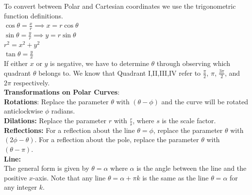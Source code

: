         \noindent To convert between Polar and Cartesian coordinates we use the trigonometric
        function definitions. \\
        $\cos\theta=\frac{x}{r}\implies x=r\cos\theta$ \\
        $\sin\theta=\frac{y}{r}\implies y=r\sin\theta$ \\
        $r^2=x^2+y^2$ \\
        $\tan\theta=\frac{y}{x}$ \\
        \noindent If either $x$ or $y$ is negative, we have to determine $\theta$ through
        observing which quadrant $\theta$ belongs to. We know that Quadrant I,II,III,IV refer to
        $\frac{\pi}{2}$, $\pi$, $\frac{3\pi}{2}$, and $2\pi$ respectively. \\

        \noindent \textbf{Transformations on Polar Curves}: \\
        \textbf{Rotations}: Replace the parameter $\theta$ with $(\theta-\phi)$ and the curve
        will be rotated anticlockwise $\phi$ radians. \\
        \textbf{Dilations:} Replace the parameter $r$ with $\frac{r}{s}$, where $s$ is the scale
        factor. \\
        \textbf{Reflections:} For a reflection about the line $\theta=\phi$, replace the parameter
        $\theta$ with $(2\phi-\theta)$. For a reflection about the pole, replace the parameter
        $\theta$ with $(\theta-\pi)$. \\

        \noindent \textbf{Line:} \\
        The general form is given by $\theta=\alpha$ where $\alpha$ is the angle between the line
        and the positive $x$-axis. Note that any line $\theta=\alpha+\pi k$ is the same as the
        line $\theta=\alpha$ for any integer $k$. \\

